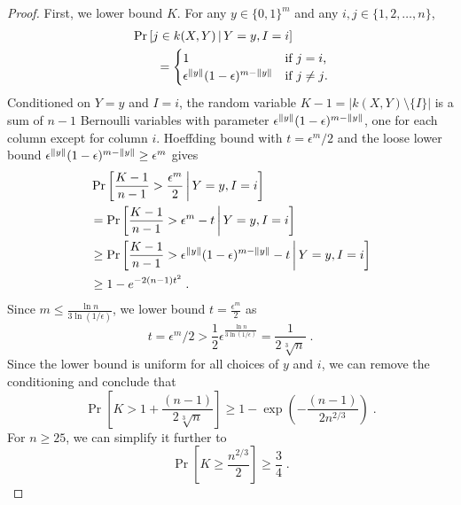 \begin{proof}
First, we lower bound $K$. For any $y \in \{0,1\}^m$ and any $i,j \in \{1,2,\dots,n\}$,
\begin{align*}
& \Pr \left[ j \in k(X,Y)  \, \middle| \, Y = y, I = i \right] \\
& \qquad =
\begin{cases}
1 & \text{if $j = i$,} \\
\epsilon^{\left\| y \right\|} (1 - \epsilon)^{m - \left\| y \right\|} & \text{if $j \neq j$.}
\end{cases}
\end{align*}
Conditioned on $Y = y$ and $I=i$, the random variable $K - 1 = |k(X,Y) \setminus \{I\}|$ is
a sum of $n-1$ Bernoulli variables with parameter $\epsilon^{\left\| y \right\|} (1 - \epsilon)^{m - \left\| y \right\|}$, one for each column except for column $i$.
Hoeffding bound with $t = \epsilon^m/2$ and the loose lower bound $\epsilon^{\left\| y \right\|} (1 - \epsilon)^{m - \left\| y \right\|} \ge \epsilon^m$ gives
\begin{align*}
& \Pr \left[ \frac{K - 1}{n - 1} > \frac{\epsilon^m}{2}  \, \middle| \,  Y = y, I = i  \right] \\
& = \Pr \left[ \frac{K - 1}{n - 1} > \epsilon^m - t  \, \middle| \,  Y = y, I = i  \right] \\
& \ge \Pr \left[ \frac{K - 1}{n - 1} > \epsilon^{\left\| y \right\|} (1 - \epsilon)^{m - \left\| y \right\|} - t  \, \middle| \,  Y = y, I = i  \right] \\
& \ge 1 - e^{-2(n-1) t^2} \; .
\end{align*}
Since $m \le \frac{\ln n}{3 \ln (1/\epsilon)}$, we lower bound $t = \frac{\epsilon^m}{2}$ as
$$
t = \epsilon^m/2 > \frac{1}{2} \epsilon^\frac{\ln n}{3 \ln(1/\epsilon)} = \frac{1}{2\sqrt[3]{n}} \; .
$$
Since the lower bound is uniform for all choices of $y$ and $i$, we can remove
the conditioning and conclude that
$$
\Pr \left[ K > 1 + \frac{(n-1)}{2\sqrt[3]{n}} \right] \ge 1 - \exp \left(- \frac{(n-1)}{2 n^{2/3}} \right) \; .
$$
For $n \ge 25$, we can simplify it further to
$$
\Pr \left[ K \ge \frac{n^{2/3}}{2} \right] \ge \frac{3}{4} \; .
$$


\end{proof}
